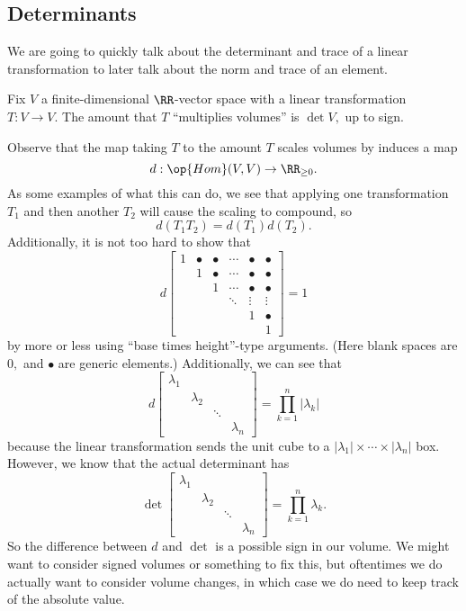 \documentclass[../notes.tex]{subfiles}
\begin{document}
\subsection{Determinants}
We are going to quickly talk about the determinant and trace of a linear transformation to later talk about the norm and trace of an element.
\begin{definition}
	Fix $V$ a finite-dimensional $\RR$-vector space with a linear transformation $T:V\to V.$ The amount that $T$ ``multiplies volumes'' is $\det V,$ up to sign.
\end{definition}
Observe that the map taking $T$ to the amount $T$ scales volumes by induces a map
\[d:\op{Hom}(V,V)\to\RR_{\ge0}.\]
As some examples of what this can do, we see that applying one transformation $T_1$ and then another $T_2$ will cause the scaling to compound, so
\[d(T_1T_2)=d(T_1)d(T_2).\]
Additionally, it is not too hard to show that
\[d\begin{bmatrix}
	1 & \bullet & \bullet & \cdots & \bullet & \bullet \\
	& 1 & \bullet & \cdots & \bullet & \bullet\\
	& & 1 & \cdots & \bullet & \bullet\\
	& &   & \ddots & \vdots & \vdots \\
	&   &        &        & 1      & \bullet \\
	&   &        &        &        & 1
\end{bmatrix}=1 \tag{1}\label{eq:det1}\]
by more or less using ``base times height''-type arguments. (Here blank spaces are $0,$ and $\bullet$ are generic elements.) Additionally, we can see that
\[d\begin{bmatrix}
	\lambda_1 \\
	& \lambda_2 \\
	& & \ddots \\
	& & & \lambda_n
\end{bmatrix}=\prod_{k=1}^n|\lambda_k|\]
because the linear transformation sends the unit cube to a $|\lambda_1|\times\cdots\times|\lambda_n|$ box. However, we know that the actual determinant has
\[\det\begin{bmatrix}
	\lambda_1 \\
	& \lambda_2 \\
	& & \ddots \\
	& & & \lambda_n
\end{bmatrix}=\prod_{k=1}^n\lambda_k. \tag{2}\label{eq:det2}\]
So the difference between $d$ and $\det$ is a possible sign in our volume. We might want to consider signed volumes or something to fix this, but oftentimes we do actually want to consider volume changes, in which case we do need to keep track of the absolute value.
\end{document}
